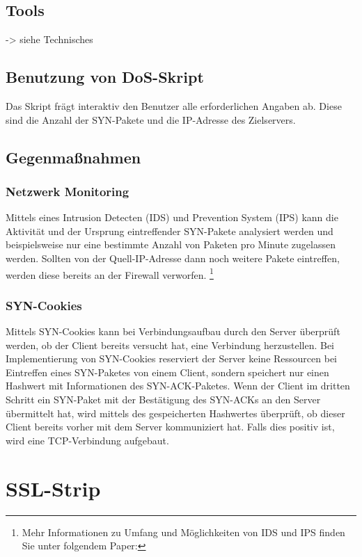 \subsection*{Tools}
-> siehe Technisches

\subsection*{Benutzung von DoS-Skript}
Das Skript frägt interaktiv den Benutzer alle erforderlichen Angaben ab. Diese sind die Anzahl der SYN-Pakete und die IP-Adresse des Zielservers.

\subsection*{Gegenmaßnahmen}

\subsubsection*{Netzwerk Monitoring}
Mittels eines Intrusion Detecten (IDS) und Prevention System (IPS) kann die Aktivität und der Ursprung eintreffender SYN-Pakete analysiert werden und beispielsweise nur eine bestimmte Anzahl von Paketen pro
Minute zugelassen werden. Sollten von der Quell-IP-Adresse dann noch weitere Pakete eintreffen, werden diese bereits an der Firewall verworfen. \footnote{Mehr Informationen zu Umfang und Möglichkeiten von IDS und IPS finden Sie unter folgendem Paper:\cite{differenceipsids}} 

\subsubsection*{SYN-Cookies}
Mittels SYN-Cookies kann bei Verbindungsaufbau durch den Server überprüft werden, ob der Client bereits versucht hat, eine Verbindung herzustellen. Bei Implementierung von SYN-Cookies reserviert der Server keine Ressourcen bei Eintreffen eines SYN-Paketes von einem Client, sondern speichert nur einen Hashwert mit Informationen des SYN-ACK-Paketes. Wenn der Client im dritten Schritt ein SYN-Paket mit der Bestätigung des SYN-ACKs an den Server übermittelt hat, wird mittels des gespeicherten Hashwertes überprüft, ob dieser Client bereits vorher mit dem Server kommuniziert hat. Falls dies positiv ist, wird eine TCP-Verbindung aufgebaut. \newpage


\section{SSL-Strip}


